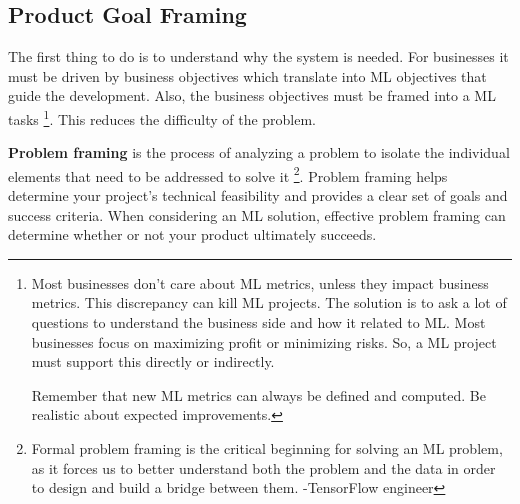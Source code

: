 \subsection*{Product Goal Framing}
The first thing to do is to understand why the system is needed.
For businesses it must be driven by business objectives which
translate into ML objectives that guide the development. Also, 
the business objectives must be framed into a ML tasks
\footnote{
    Most businesses don't care about ML metrics, 
    unless they impact business metrics. This discrepancy can kill
    ML projects. The solution is to ask a lot of questions to
    understand the business side and how it related to ML. Most 
    businesses focus on maximizing profit or minimizing risks. So,
    a ML project must support this directly or indirectly.

    Remember that new ML metrics can always be defined and computed.
    Be realistic about expected improvements.
}.
This reduces the difficulty of the problem.

\textbf{Problem framing} is the process of analyzing a problem to isolate
the individual elements that need to be addressed to solve it
\footnote{
    Formal problem framing is the critical beginning for solving
    an ML problem, as it forces us to better understand both the
    problem and the data in order to design and build a bridge
    between them. -TensorFlow engineer
}.
Problem framing helps determine your project's technical
feasibility and provides a clear set of goals and success
criteria. When considering an ML solution, effective problem
framing can determine whether or not your product ultimately
succeeds.

